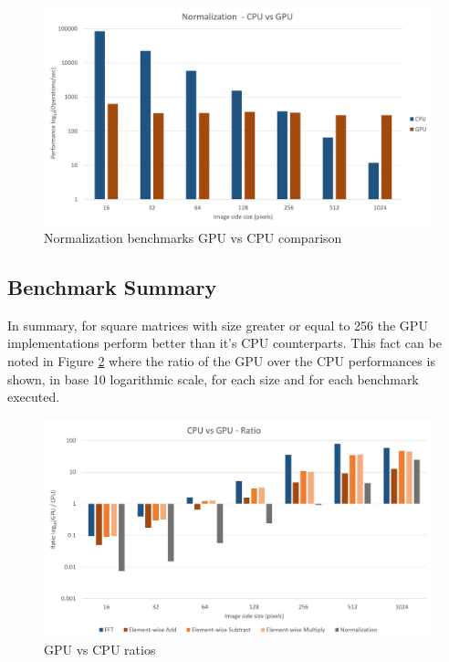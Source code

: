       \begin{figure}[H]
      	\centering
      	\includegraphics[width=\plotwidth]{images/results/benchmarks/plot-normalization}
      	\caption{Normalization benchmarks GPU vs CPU comparison}
      	\label{fig:plot-normalization}
      \end{figure}
    
    \subsection{Benchmark Summary}
    
      In summary, for square matrices with size greater or equal to 256 the GPU implementations perform better than it's CPU counterparts. This fact can be noted in Figure \ref{fig:plot-ratios} where the ratio of the GPU over the CPU performances is shown, in base 10 logarithmic scale, for each size and for each benchmark executed.
    
      \begin{figure}[H]
      	\centering
      	\includegraphics[width=\plotwidth]{images/results/benchmarks/plot-ratios}
      	\caption{GPU vs CPU ratios}
      	\label{fig:plot-ratios}
      \end{figure}
      